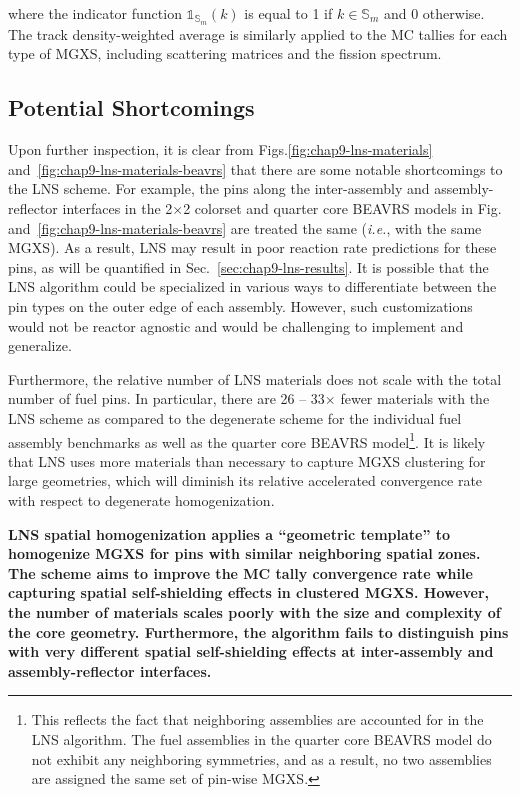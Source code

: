 \noindent where the indicator function $\mathbb{1}_{\mathbb{S}_{m}}(k)$ is equal to 1 if $k \in \mathbb{S}_{m}$ and 0 otherwise. The track density-weighted average is similarly applied to the \ac{MC} tallies for each type of \ac{MGXS}, including scattering matrices and the fission spectrum.

\subsection{Potential Shortcomings}
\label{subsec:chap9-lns-shortcomings}

Upon further inspection, it is clear from Figs.\ref{fig:chap9-lns-materials} and~\ref{fig:chap9-lns-materials-beavrs} that there are some notable shortcomings to the \ac{LNS} scheme. For example, the pins along the inter-assembly and assembly-reflector interfaces in the 2$\times$2 colorset and quarter core \ac{BEAVRS} models in Fig.~ and~\ref{fig:chap9-lns-materials-beavrs} are treated the same (\textit{i.e.}, with the same \ac{MGXS}). As a result, \ac{LNS} may result in poor reaction rate predictions for these pins, as will be quantified in Sec.~\ref{sec:chap9-lns-results}. It is possible that the \ac{LNS} algorithm could be specialized in various ways to differentiate between the pin types on the outer edge of each assembly. However, such customizations would not be reactor agnostic and would be challenging to implement and generalize.

Furthermore, the relative number of \ac{LNS} materials does not scale with the total number of fuel pins. In particular, there are 26 -- 33$\times$ fewer materials with the \ac{LNS} scheme as compared to the degenerate scheme for the individual fuel assembly benchmarks as well as the quarter core \ac{BEAVRS} model\footnote{This reflects the fact that neighboring assemblies are accounted for in the \ac{LNS} algorithm. The fuel assemblies in the quarter core \ac{BEAVRS} model do not exhibit any neighboring symmetries, and as a result, no two assemblies are assigned the same set of pin-wise \ac{MGXS}.}. It is likely that \ac{LNS} uses more materials than necessary to capture \ac{MGXS} clustering for large geometries, which will diminish its relative accelerated convergence rate with respect to degenerate homogenization.

\begin{emphbox}
\textbf{\ac{LNS} spatial homogenization applies a ``geometric template'' to homogenize \ac{MGXS} for pins with similar neighboring spatial zones. The scheme aims to improve the \ac{MC} tally convergence rate while capturing spatial self-shielding effects in clustered \ac{MGXS}. However, the number of materials scales poorly with the size and complexity of the core geometry. Furthermore, the algorithm fails to distinguish pins with very different spatial self-shielding effects at inter-assembly and assembly-reflector interfaces.}
\end{emphbox}


